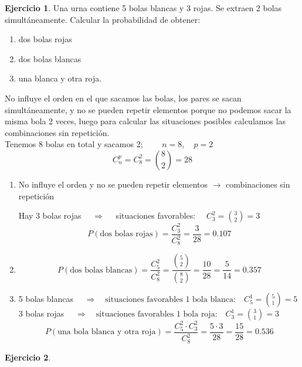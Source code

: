 \documentclass[a4paper, 12pt]{article}
\theoremstyle{definition}
\newtheorem{ej}{Ejercicio}
\begin{document}
\begin{ej}
Una urna contiene 5 bolas blancas y 3 rojas. Se extraen 2 bolas simultáneamente. Calcular la
probabilidad de obtener:
\begin{enumerate}[label=\textit{\alph*)}]
\item dos bolas rojas
\item dos bolas blancas
\item una blanca y otra roja.
\end{enumerate}

No influye el orden en el que sacamos las bolas, los pares se sacan simultáneamente, y no se pueden repetir elementos porque no podemos sacar la misma bola 2 veces, luego para calcular las situaciones posibles calculamos las combinaciones sin repetición. \\
Tenemos 8 bolas en total y sacamos 2; $\qquad n=8 , \quad p=2$
\[C^p_n = C^2_8 = \binom{8}{2} = 28\]
\begin{enumerate}[label=\textit{\alph*)}]
\item No influye el orden y no se pueden repetir elementos $\longrightarrow$ combinaciones sin repetición

Hay 3 bolas rojas $\quad\Longrightarrow\quad$ situaciones favorables: $\quad C_3^2 = \binom{3}{2} = 3$
\[P(\text{dos bolas rojas}) = \frac{C_3^2}{C_8^2} = \frac{3}{28} = 0.107\]
\item \[P(\text{dos bolas blancas}) = \frac{C_5^2}{C_8^2} = \frac{\binom{5}{2}}{\binom{8}{2}} = \frac{10}{28} = \frac{5}{14} = 0.357\]
\item 5 bolas blancas $\quad\Longrightarrow\quad \text{situaciones favorables 1 bola blanca:}\quad C_5^1 = \binom{5}{1} = 5$ \\
3 bolas rojas $\quad\Longrightarrow\quad \text{situaciones favorables 1 bola roja:}\quad C_3^1 = \binom{3}{1} = 3$
\[P(\text{una bola blanca y otra roja}) = \frac{C_5^2 \cdot C_3^2}{C_8^2} = \frac{5\cdot3}{28} = \frac{15}{28} = 0.536\]
\end{enumerate}

\end{ej}

\medskip

\begin{ej}
\end{ej}
\end{document}
